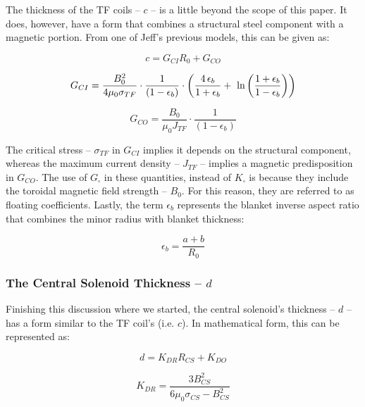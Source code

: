 The thickness of the TF coils -- $c$ -- is a little beyond the scope of this paper. It does, however, have a form that combines a structural steel component with a magnetic portion. From one of Jeff's previous models, this can be given as:

\begin{equation}
	\label{eq:cc}
	c = G_{CI} R_0 + G_{CO}
\end{equation}

\begin{equation}
	G_{CI} = \frac{B_{0}^2}{ 4 \mu_0 \sigma_{TF} } \cdot \frac{1}{ ( 1 - \epsilon_b )}  \cdot \left( \frac{ 4 \, \epsilon_b}{1+\epsilon_b} + \ \textnormal{ln} \left( \frac{1+\epsilon_b}{1-\epsilon_b} \right) \right) 
\end{equation}

\begin{equation}
	G_{CO} = \frac{B_{0}}{ \mu_0 J_{TF} } \cdot \frac{1}{ ( 1 - \epsilon_b )}
\end{equation}

The critical stress -- $\sigma_{TF}$ in $G_{CI}$ implies it depends on the structural component, whereas the maximum current density -- $J_{TF}$ -- implies a magnetic predisposition in $G_{CO}$. The use of $G_\square$ in these quantities, instead of $K_\square$ is because they include the toroidal magnetic field strength -- $B_0$. For this reason, they are referred to as floating coefficients. Lastly, the term $\epsilon_b$ represents the blanket inverse aspect ratio that combines the minor radius with blanket thickness:

\begin{equation}
	\epsilon_b = \frac{ a + b }{R_0}
\end{equation}

\subsubsection{The Central Solenoid Thickness -- $d$}

Finishing this discussion where we started, the central solenoid's thickness -- $d$ -- has a form similar to the TF coil's (i.e. $c$). In mathematical form, this can be represented as:

 \begin{equation}
 	\label{eq:dd}
	d = K_{DR} R_{CS} + K_{DO}
\end{equation}

\begin{equation}
	K_{DR} = \frac{3 B_{CS}^2}{ 6 \mu_0 \sigma_{CS}  - B_{CS}^2 }
\end{equation}

